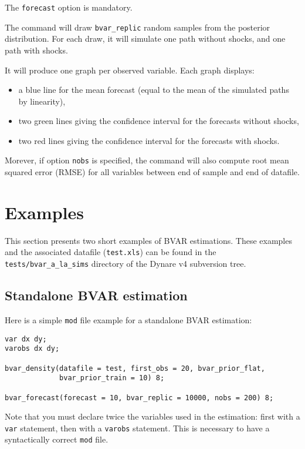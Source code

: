 \documentclass[10pt,a4paper]{article}
\begin{document}
The \texttt{forecast} option is mandatory.

The command will draw \texttt{bvar\_replic} random samples from the posterior distribution. For each draw, it will simulate one path without shocks, and one path with shocks.

It will produce one graph per observed variable. Each graph displays:
\begin{itemize}
\item a blue line for the mean forecast (equal to the mean of the simulated paths by linearity),
\item two green lines giving the confidence interval for the forecasts without shocks,
\item two red lines giving the confidence interval for the forecasts with shocks.
\end{itemize}

Morever, if option \texttt{nobs} is specified, the command will also compute root mean squared error (RMSE) for all variables between end of sample and end of datafile.

\section{Examples}

This section presents two short examples of BVAR estimations. These examples and the associated datafile (\texttt{test.xls}) can be found in the \texttt{tests/bvar\_a\_la\_sims} directory of the Dynare v4 subversion tree.

\subsection{Standalone BVAR estimation}

Here is a simple \texttt{mod} file example for a standalone BVAR estimation:

\begin{verbatim}
var dx dy;
varobs dx dy;

bvar_density(datafile = test, first_obs = 20, bvar_prior_flat,
             bvar_prior_train = 10) 8;

bvar_forecast(forecast = 10, bvar_replic = 10000, nobs = 200) 8;
\end{verbatim}

Note that you must declare twice the variables used in the estimation: first with a \texttt{var} statement, then with a \texttt{varobs} statement. This is necessary to have a syntactically correct \texttt{mod} file.
\end{document}

